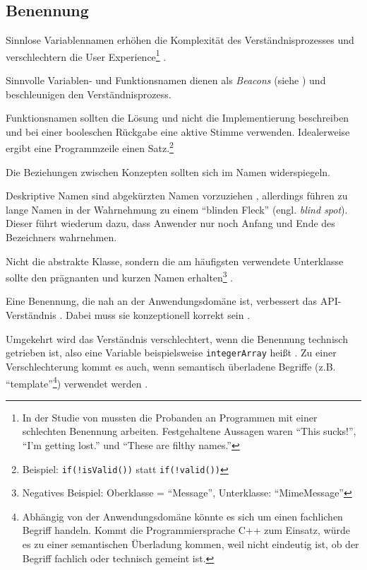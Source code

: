\subsection{Benennung}
\label{sec:naming}

Sinnlose Variablennamen erhöhen die Komplexität des Verständnisprozesses \citep{BenShneiderman:gn} und verschlechtern die User Experience\footnote{In der Studie von \cite{Blinman:2005wr} mussten die Probanden an Programmen mit einer schlechten Benennung arbeiten. Festgehaltene Aussagen waren ``This sucks!'', ``I'm getting lost.'' und ``These are filthy names.''} \citep{Blinman:2005wr}.

Sinnvolle Variablen- und Funktionsnamen dienen als \textit{Beacons} (siehe ) und beschleunigen den Verständnisprozess. \citep{Gellenbeck:1991vn}

Funktionsnamen sollten die Lösung und nicht die Implementierung beschreiben und bei einer booleschen Rückgabe  eine aktive Stimme verwenden. Idealerweise ergibt eine Programmzeile einen Satz.\footnote{Beispiel: \texttt{if(!isValid())} statt \texttt{if(!valid())}} \citep{cwalina2008framework}

Die Beziehungen zwischen Konzepten sollten sich im Namen widerspiegeln. \citep{cwalina2008framework,Watson:2009da}

Deskriptive Namen sind abgekürzten Namen vorzuziehen \citep{Zibran:2011fx}, allerdings führen zu lange Namen  in der Wahrnehmung zu einem ``blinden Fleck'' (engl. \textit{blind spot}). Dieser führt wiederum dazu, dass Anwender nur noch Anfang und Ende des Bezeichners wahrnehmen. \citep{Beaton:2008jn}

Nicht die abstrakte Klasse, sondern die am häufigsten verwendete Unterklasse sollte den prägnanten und kurzen Namen erhalten\footnote{Negatives Beispiel: Oberklasse = ``Message'', Unterklasse: ``MimeMessage''} \citep{Stylos:2008jt}.

Eine Benennung, die nah an der Anwendungsdomäne ist, verbessert das API-Verständnis \citep{BenShneiderman:gn,Tenny:1988ir,Teasley:1994gr,Briand:1997fw,Jeong:kf}. Dabei muss sie konzeptionell korrekt sein \citep{Zibran:2011fx}.

Umgekehrt wird das Verständnis verschlechtert, wenn die Benennung technisch getrieben ist, also eine Variable beispielsweise \texttt{integerArray} heißt \citep{Teasley:1994gr}. Zu einer Verschlechterung kommt es auch, wenn semantisch überladene Begriffe (z.B. ``template''\footnote{Abhängig von der Anwendungsdomäne könnte es sich um einen fachlichen Begriff handeln. Kommt die Programmiersprache C++ zum Einsatz, würde es zu einer semantischen Überladung kommen, weil nicht eindeutig ist, ob der Begriff fachlich oder technisch gemeint ist.}) verwendet werden \citep{Gellenbeck:1991vn}.

